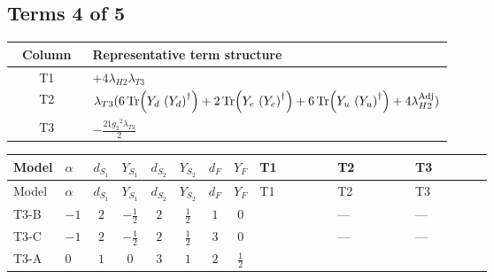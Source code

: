 \documentclass[8pt]{article}
\begin{document}
\begin{landscape}
\subsection*{Terms 4 of 5}
\begin{center}
\begin{tabular}{@{}c >{\raggedright\arraybackslash}p{0.82\linewidth}@{}}
\toprule
Column & Representative term structure \\
\midrule
T1 & \(\displaystyle +4 {\lambda_{H2}} {\lambda_{T3}}\) \\
\midrule
T2 & \(\displaystyle {\lambda_{T3}} (6 \operatorname{Tr}\!\left({Y_d}\,\left({Y_d}\right)^{\dagger}\right)+2 \operatorname{Tr}\!\left({Y_e}\,\left({Y_e}\right)^{\dagger}\right)+6 \operatorname{Tr}\!\left({Y_u}\,\left({Y_u}\right)^{\dagger}\right)+4 {\lambda_{H2}^{\rm Adj}})\) \\
\midrule
T3 & \(\displaystyle -\frac{21 {g_2}^2 {\lambda_{T3}}}{2}\) \\
\midrule
\bottomrule
\end{tabular}
\end{center}
\smallskip
\tiny
\begin{longtable}{@{}llcccccc >{\raggedright\arraybackslash}p{0.21\linewidth} >{\raggedright\arraybackslash}p{0.21\linewidth} >{\raggedright\arraybackslash}p{0.21\linewidth}@{}}
\toprule
Model & $\alpha$ & $d_{S_1}$ & $Y_{S_1}$ & $d_{S_2}$ & $Y_{S_2}$ & $d_F$ & $Y_F$ & T1 & T2 & T3 \\
\midrule
\endfirsthead
\toprule
Model & $\alpha$ & $d_{S_1}$ & $Y_{S_1}$ & $d_{S_2}$ & $Y_{S_2}$ & $d_F$ & $Y_F$ & T1 & T2 & T3 \\
\midrule
\endhead
T3-B & $-1$ & $2$ & $-\frac{1}{2}$ & $2$ & $\frac{1}{2}$ & $1$ & $0$ & \scriptsize\adjustbox{max width=\linewidth}{$\begin{gathered} +4 {\lambda_{H2}} {\lambda_{T3}}\end{gathered}$} & --- & --- \\
\midrule
T3-C & $-1$ & $2$ & $-\frac{1}{2}$ & $2$ & $\frac{1}{2}$ & $3$ & $0$ & \scriptsize\adjustbox{max width=\linewidth}{$\begin{gathered} +4 {\lambda_{H2}} {\lambda_{T3}}\end{gathered}$} & --- & --- \\
\midrule
T3-A & $0$ & $1$ & $0$ & $3$ & $1$ & $2$ & $\frac{1}{2}$ & \scriptsize\adjustbox{max width=\linewidth}{$\begin{gathered} +4 {\lambda_{H2}} {\lambda_{T3}}\end{gathered}$} & \scriptsize\adjustbox{max width=\linewidth}{$\begin{gathered} {\lambda_{T3}} (6 \operatorname{Tr}\!\left({Y_d}\,\left({Y_d}\right)^{\dagger}\right)+2 \operatorname{Tr}\!\left({Y_e}\,\left({Y_e}\right)^{\dagger}\right)+6 \operatorname{Tr}\!\left({Y_u}\,\left({Y_u}\right)^{\dagger}\right)+4 {\lambda_{H2}^{\rm Adj}})\end{gathered}$} & \scriptsize\adjustbox{max width=\linewidth}{$\begin{gathered} -\frac{21 {g_2}^2 {\lambda_{T3}}}{2}\end{gathered}$} \\

\end{longtable}
\end{landscape}
\end{document}
